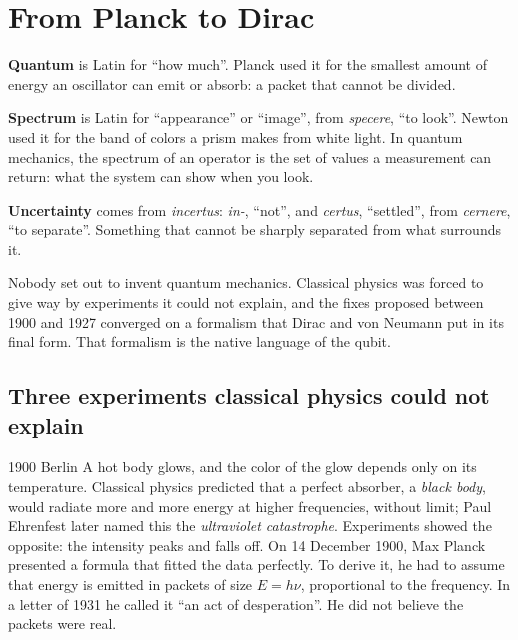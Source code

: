 \chapter{From Planck to Dirac}\label{ch:quantum}

\begin{etymology}
\textbf{Quantum} is Latin for ``how much''. Planck used it for the smallest
amount of energy an oscillator can emit or absorb: a packet that cannot be
divided.

\textbf{Spectrum} is Latin for ``appearance'' or ``image'', from \emph{specere},
``to look''. Newton used it for the band of colors a prism makes from white
light. In quantum mechanics, the spectrum of an operator is the set of values a
measurement can return: what the system can show when you look.

\textbf{Uncertainty} comes from \emph{incertus}: \emph{in-}, ``not'', and
\emph{certus}, ``settled'', from \emph{cernere}, ``to separate''. Something that
cannot be sharply separated from what surrounds it.
\end{etymology}

Nobody set out to invent quantum mechanics. Classical physics was forced to give
way by experiments it could not explain, and the fixes proposed between 1900 and
1927 converged on a formalism that Dirac and von Neumann put in its final form.
That formalism is the native language of the qubit.

\section{Three experiments classical physics could not explain}

\begin{history}{1900 \textperiodcentered{} Berlin}
A hot body glows, and the color of the glow depends only on its temperature.
Classical physics predicted that a perfect absorber, a \emph{black body}, would
radiate more and more energy at higher frequencies, without limit; Paul
Ehrenfest later named this the \emph{ultraviolet catastrophe}. Experiments
showed the opposite: the intensity peaks and falls off. On 14 December 1900, Max
Planck presented a formula that fitted the data perfectly. To derive it, he had to
assume that energy is emitted in packets of size $E = h\nu$, proportional to the
frequency. In a letter of 1931 he called it ``an act of desperation''. He did not
believe the packets were real.
\end{history}

